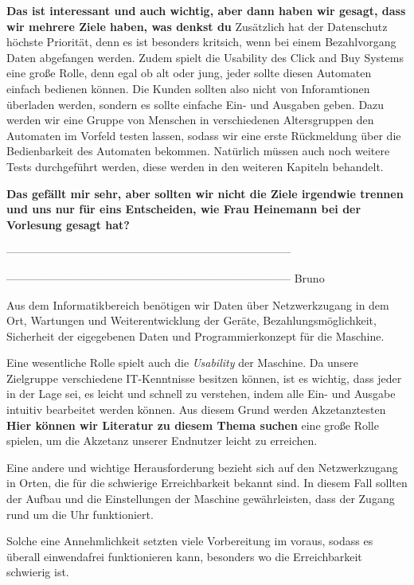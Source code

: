 \textbf{Das ist interessant und auch wichtig, aber dann haben wir gesagt, dass wir mehrere Ziele haben, was denkst du}
Zusätzlich hat der Datenschutz höchste Priorität, denn es ist besonders kritsich, wenn bei einem Bezahlvorgang 
Daten abgefangen werden. 
Zudem spielt die Usability des Click and Buy Systems eine große Rolle, denn egal ob alt oder jung, 
jeder sollte diesen Automaten einfach bedienen können. Die Kunden sollten also nicht von Inforamtionen überladen werden, 
sondern es sollte einfache Ein- und Ausgaben geben. Dazu werden wir eine Gruppe von Menschen in verschiedenen Altersgruppen 
den Automaten im Vorfeld testen lassen, sodass wir eine erste Rückmeldung über die Bedienbarkeit des Automaten bekommen.
Natürlich müssen auch noch weitere Tests durchgeführt werden, diese werden in den weiteren Kapiteln behandelt.


\textbf{Das gefällt mir sehr, aber sollten wir nicht die Ziele irgendwie trennen und uns nur für eins Entscheiden, 
wie Frau Heinemann bei der Vorlesung gesagt hat?}


-----------------------------------------------------------------------------


----------------------------------------------------------------------------- Bruno

Aus dem Informatikbereich benötigen wir Daten über Netzwerkzugang in dem Ort, Wartungen und Weiterentwicklung der 
Geräte, Bezahlungsmöglichkeit, Sicherheit der eigegebenen Daten und Programmierkonzept für die Maschine.


Eine wesentliche Rolle spielt auch die \textit{Usability} der Maschine. Da unsere Zielgruppe verschiedene IT-Kenntnisse
besitzen können, ist es wichtig, dass jeder in der Lage sei, es leicht und schnell zu verstehen, indem alle Ein- und
Ausgabe intuitiv bearbeitet werden können. Aus diesem Grund werden Akzetanztesten \textbf{Hier können wir 
Literatur zu diesem Thema suchen} eine große Rolle spielen, um die Akzetanz unserer Endnutzer leicht zu erreichen. 


Eine andere und wichtige Herausforderung bezieht sich auf den Netzwerkzugang in Orten, die für die schwierige 
Erreichbarkeit bekannt sind. In diesem Fall sollten der Aufbau und die Einstellungen der Maschine gewährleisten,
 dass der Zugang rund um die Uhr funktioniert.


Solche eine Annehmlichkeit setzten viele Vorbereitung im voraus, sodass es überall einwendafrei funktionieren kann,
besonders wo die Erreichbarkeit schwierig ist. 


